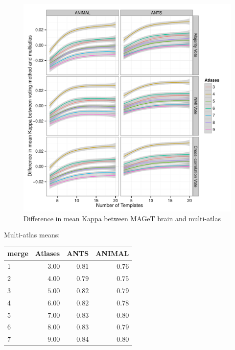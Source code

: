 \documentclass{article}\usepackage{graphicx, color}
\makeatletter
\def\maxwidth{ %
  \ifdim\Gin@nat@width>\linewidth
    \linewidth
  \else
    \Gin@nat@width
  \fi
}
\newenvironment{knitrout}{}{} %
\makeatother
\begin{document}
\begin{figure}
\begin{knitrout}
\color{fgcolor}

{\centering \includegraphics[width=\maxwidth]{figure/ADN1-cross-validation-MA-difference} 

}


\end{knitrout}

  \caption{Difference in mean Kappa between MAGeT brain and multi-atlas}
  \label{ADNI1_cross_validation_MA_difference}
\end{figure}



Multi-atlas means:


%
\begin{table}[!tbp]
\begin{center}
\begin{tabular}{lrrr}
\hline\hline
\multicolumn{1}{l}{merge}&\multicolumn{1}{c}{Atlases}&\multicolumn{1}{c}{ANTS}&\multicolumn{1}{c}{ANIMAL}\tabularnewline
\hline
1&$3.00$&$0.81$&$0.76$\tabularnewline
2&$4.00$&$0.79$&$0.75$\tabularnewline
3&$5.00$&$0.82$&$0.79$\tabularnewline
4&$6.00$&$0.82$&$0.78$\tabularnewline
5&$7.00$&$0.83$&$0.80$\tabularnewline
6&$8.00$&$0.83$&$0.79$\tabularnewline
7&$9.00$&$0.84$&$0.80$\tabularnewline
\hline
\end{tabular}
\end{center}
\end{table}
\end{document}
